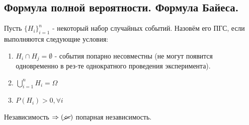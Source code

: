 \subsection{Формула полной вероятности. Формула Байеса.}

\begin{definition}
	Пусть $ \{ H_i \}_{i=1}^n $ - некоторый набор случайных событий. Назовём его ПГС, если выполняются следующие условия:
	\begin{enumerate}
		\item $H_i \cap H_j = \emptyset$ - события попарно несовместны (не могут появится одновременно в рез-те однократного проведения эксперимента).
		\item $\bigcup\limits_{i=1}^{n} H_i = \Omega$
		\item $P(H_i) > 0, \forall i$
	\end{enumerate}
\end{definition}

\begin{remark}
	Независимость $\Rightarrow (\cancel{\Leftarrow})$ попарная независимость.
\end{remark}

